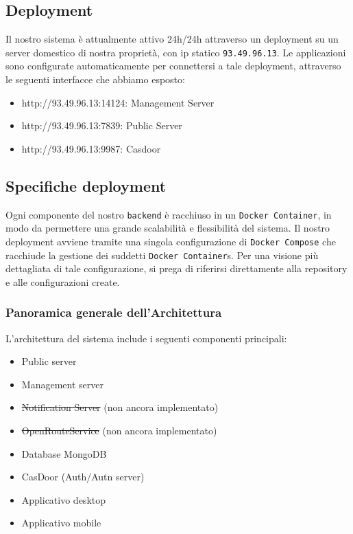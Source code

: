 \documentclass{article}
\begin{document}
\subsection{Deployment}
Il nostro sistema è attualmente attivo 24h/24h attraverso un deployment su un server domestico di nostra proprietà, con ip statico \texttt{93.49.96.13}.
Le applicazioni sono configurate automaticamente per connettersi a tale deployment, attraverso le seguenti interfacce che abbiamo esposto:
\begin{itemize}
	\item http://93.49.96.13:14124: Management Server
	\item http://93.49.96.13:7839: Public Server
	\item http://93.49.96.13:9987: Casdoor
\end{itemize}

\subsection{Specifiche deployment}
Ogni componente del nostro \texttt{backend} è racchiuso in un \texttt{Docker Container}, in modo da permettere una grande scalabilità e flessibilità del sistema.
Il nostro deployment avviene tramite una singola configurazione di \texttt{Docker Compose} che racchiude la gestione dei suddetti \texttt{Docker Container}s.
Per una visione più dettagliata di tale configurazione, si prega di riferirsi direttamente alla repository e alle configurazioni create.

\subsubsection{Panoramica generale dell'Architettura}
L'architettura del sistema include i seguenti componenti principali:
\begin{itemize}
    \item Public server
    \item Management server
    \item \st{Notification Server} (non ancora implementato)
    \item \st{OpenRouteService} (non ancora implementato)
    \item Database MongoDB
    \item CasDoor (Auth/Autn server)
    \item Applicativo desktop
    \item Applicativo mobile
\end{itemize}
\end{document}
